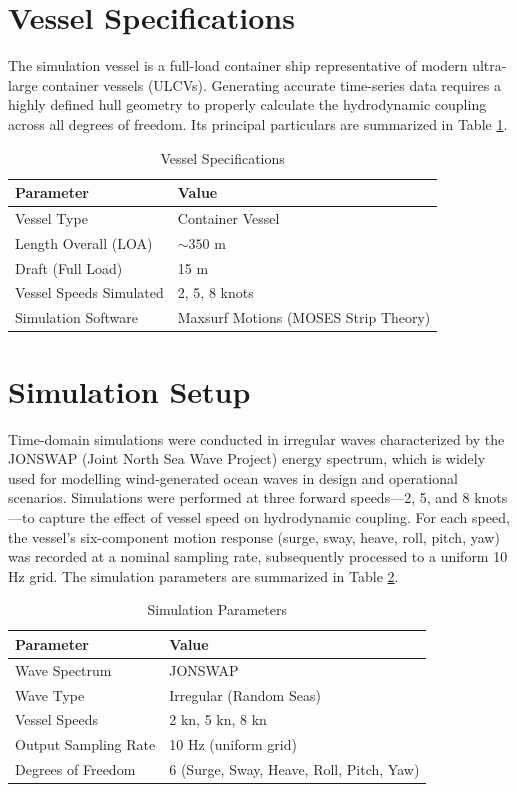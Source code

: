 \section{Vessel Specifications}
The simulation vessel is a full-load container ship representative of modern ultra-large container vessels (ULCVs). Generating accurate time-series data requires a highly defined hull geometry to properly calculate the hydrodynamic coupling across all degrees of freedom. Its principal particulars are summarized in Table \ref{tab:vessel_specs}.

\begin{table}[H]
\centering
\caption{Vessel Specifications}
\label{tab:vessel_specs}
\vspace{0.2cm}
\begin{tabular}{@{}ll@{}}
\toprule
\textbf{Parameter} & \textbf{Value} \\ \midrule
Vessel Type & Container Vessel \\
Length Overall (LOA) & $\sim 350$ m \\
Draft (Full Load) & 15 m \\
Vessel Speeds Simulated & 2, 5, 8 knots \\
Simulation Software & Maxsurf Motions (MOSES Strip Theory) \\ \bottomrule
\end{tabular}
\end{table}

\section{Simulation Setup}
Time-domain simulations were conducted in irregular waves characterized by the JONSWAP (Joint North Sea Wave Project) energy spectrum, which is widely used for modelling wind-generated ocean waves in design and operational scenarios. Simulations were performed at three forward speeds—2, 5, and 8 knots—to capture the effect of vessel speed on hydrodynamic coupling. For each speed, the vessel's six-component motion response (surge, sway, heave, roll, pitch, yaw) was recorded at a nominal sampling rate, subsequently processed to a uniform 10 Hz grid. The simulation parameters are summarized in Table \ref{tab:sim_params}.

\begin{table}[H]
\centering
\caption{Simulation Parameters}
\label{tab:sim_params}
\vspace{0.2cm}
\begin{tabular}{@{}ll@{}}
\toprule
\textbf{Parameter} & \textbf{Value} \\ \midrule
Wave Spectrum & JONSWAP \\
Wave Type & Irregular (Random Seas) \\
Vessel Speeds & 2 kn, 5 kn, 8 kn \\
Output Sampling Rate & 10 Hz (uniform grid) \\
Degrees of Freedom & 6 (Surge, Sway, Heave, Roll, Pitch, Yaw) \\ \bottomrule
\end{tabular}
\end{table}

